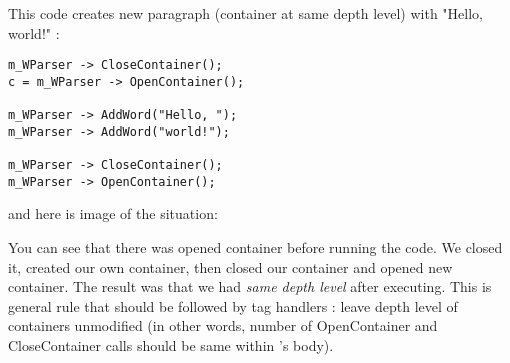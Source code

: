 This code creates new paragraph (container at same depth level)
with "Hello, world!" :

\begin{verbatim}
m_WParser -> CloseContainer();
c = m_WParser -> OpenContainer();

m_WParser -> AddWord("Hello, ");
m_WParser -> AddWord("world!");

m_WParser -> CloseContainer();
m_WParser -> OpenContainer();
\end{verbatim}

and here is image of the situation:


You can see that there was opened container before running the code. We closed
it, created our own container, then closed our container and opened
new container. The result was that we had {\it same depth level} after
executing. This is general rule that should be followed by tag handlers :
leave depth level of containers unmodified (in other words, number of
OpenContainer and CloseContainer calls should be same within 's body).

